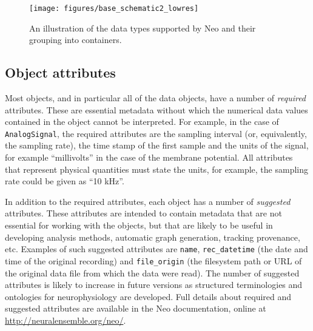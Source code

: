 \documentclass{frontiers}
\newcommand{\documentation}{\url{http://neuralensemble.org/neo/}}
\begin{document}
\begin{figure}
\centering
\texttt{[image: figures/base\_schematic2\_lowres]}
\caption{An illustration of the data types supported by Neo and their grouping into containers.}\label{fig:overview} 
\end{figure}
%
%
%


\subsection{Object attributes}

Most objects, and in particular all of the data objects, have a number of \emph{required} attributes.
These are essential metadata without which the numerical data values contained in the object cannot be interpreted.
For example, in the case of \lstinline`AnalogSignal`, the required attributes are the sampling interval (or, equivalently, the sampling rate), the time stamp of the first sample and the units of the signal, for example ``millivolts'' in the case of the membrane potential. 
All attributes that represent physical quantities must state the units, for example, the sampling rate could be given as ``10 kHz''.

In addition to the required attributes, each object has a number of \emph{suggested} attributes.
These attributes are intended to contain metadata that are not essential for working with the objects, but that are likely to be useful in developing analysis methods, automatic graph generation, tracking provenance, etc.
Examples of such suggested attributes are \lstinline`name`, \lstinline`rec_datetime` (the date and time of the original recording) and \lstinline`file_origin` (the filesystem path or URL of the original data file from which the data were read).
The number of suggested attributes is likely to increase in future versions as structured terminologies and ontologies for neurophysiology are developed.
Full details about required and suggested attributes are available in the Neo documentation, online at \documentation.
\end{document}
